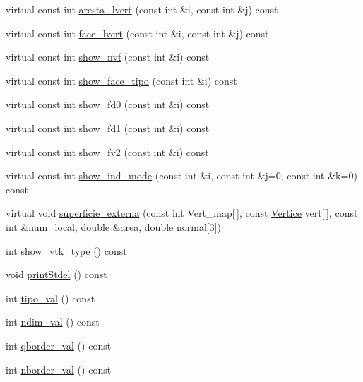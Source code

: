 \begin{DoxyCompactItemize}
\item 
virtual const int \hyperlink{classQuadrilateral_acfc70a6c1737d40c4f5f4fb38525f929}{aresta\+\_\+lvert} (const int \&i, const int \&j) const
\item 
virtual const int \hyperlink{classQuadrilateral_a1bf6b904ece09fa6e82c70b88118c33f}{face\+\_\+lvert} (const int \&i, const int \&j) const
\item 
virtual const int \hyperlink{classQuadrilateral_a1ee9b57112c7d840338d7326e4d86ffc}{show\+\_\+nvf} (const int \&i) const
\item 
virtual const int \hyperlink{classQuadrilateral_a00c61211ab8aa2447d651f6dce2db301}{show\+\_\+face\+\_\+tipo} (const int \&i) const
\item 
virtual const int \hyperlink{classQuadrilateral_a37f35e0253b296804417fdbb087d155c}{show\+\_\+fd0} (const int \&i) const
\item 
virtual const int \hyperlink{classQuadrilateral_a679e364920cf90d28114bf85a525408f}{show\+\_\+fd1} (const int \&i) const
\item 
virtual const int \hyperlink{classQuadrilateral_a32796d1fcdbc5d7372c9b5c08c7d5a61}{show\+\_\+fv2} (const int \&i) const
\item 
virtual const int \hyperlink{classQuadrilateral_a346c5ac301c7ffad41ea7278fe45c45b}{show\+\_\+ind\+\_\+mode} (const int \&i, const int \&j=0, const int \&k=0) const
\item 
virtual void \hyperlink{classQuadrilateral_aef8a1501a818c1a7470a62d5cc7fd3d8}{superficie\+\_\+externa} (const int Vert\+\_\+map\mbox{[}$\,$\mbox{]}, const \hyperlink{structVertice}{Vertice} vert\mbox{[}$\,$\mbox{]}, const int \&num\+\_\+local, double \&area, double normal\mbox{[}3\mbox{]})
\item 
int \hyperlink{classStdel_a56288a857b95a55c8b7eb5b473e836d9}{show\+\_\+vtk\+\_\+type} () const
\item 
void \hyperlink{classStdel_a54b5768d09f500cb949e66fc234eac70}{print\+Stdel} () const
\item 
int \hyperlink{classStdel_a75023fc369db2752845a9ce278f10929}{tipo\+\_\+val} () const
\item 
int \hyperlink{classStdel_a383df930bee8dc298d7d412b3b632ebb}{ndim\+\_\+val} () const
\item 
int \hyperlink{classStdel_a457d20e34fb7a32eb1e4aca6c19f53a2}{qborder\+\_\+val} () const
\item 
int \hyperlink{classStdel_aac8e97661e46c48fafa91f13caa03a9f}{nborder\+\_\+val} () const
\item 

\end{DoxyCompactItemize}
